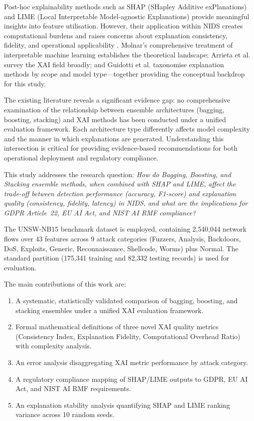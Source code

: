 \documentclass[conference]{IEEEtran}
\begin{document}
Post-hoc explainability methods such as SHAP (SHapley Additive exPlanations) \cite{lundberg2017} and LIME (Local Interpretable Model-agnostic Explanations) \cite{ribeiro2016} provide meaningful insights into feature utilisation. However, their application within NIDS creates computational burdens and raises concerns about explanation consistency, fidelity, and operational applicability \cite{zibi2025a}. Molnar's comprehensive treatment of interpretable machine learning \cite{molnar2020} establishes the theoretical landscape; Arrieta et al. \cite{arrieta2020} survey the XAI field broadly; and Guidotti et al. \cite{guidotti2018} taxonomise explanation methods by scope and model type---together providing the conceptual backdrop for this study.

The existing literature reveals a significant evidence gap: no comprehensive examination of the relationship between ensemble architectures (bagging, boosting, stacking) and XAI methods has been conducted under a unified evaluation framework. Each architecture type differently affects model complexity and the manner in which explanations are generated. Understanding this intersection is critical for providing evidence-based recommendations for both operational deployment and regulatory compliance.

This study addresses the research question: \textit{How do Bagging, Boosting, and Stacking ensemble methods, when combined with SHAP and LIME, affect the trade-off between detection performance (accuracy, F1-score) and explanation quality (consistency, fidelity, latency) in NIDS, and what are the implications for GDPR Article~22, EU AI Act, and NIST AI RMF compliance?}

The UNSW-NB15 benchmark dataset \cite{moustafa2015} is employed, containing 2{,}540{,}044 network flows over 43 features across 9 attack categories (Fuzzers, Analysis, Backdoors, DoS, Exploits, Generic, Reconnaissance, Shellcode, Worms) plus Normal. The standard partition (175{,}341 training and 82{,}332 testing records) is used for evaluation.

The main contributions of this work are:
\begin{enumerate}
  \item A systematic, statistically validated comparison of bagging, boosting, and stacking ensembles under a unified XAI evaluation framework.
  \item Formal mathematical definitions of three novel XAI quality metrics (Consistency Index, Explanation Fidelity, Computational Overhead Ratio) with complexity analysis.
  \item An error analysis disaggregating XAI metric performance by attack category.
  \item A regulatory compliance mapping of SHAP/LIME outputs to GDPR, EU AI Act, and NIST AI RMF requirements.
  \item An explanation stability analysis quantifying SHAP and LIME ranking variance across 10 random seeds.
\end{enumerate}
\end{document}
